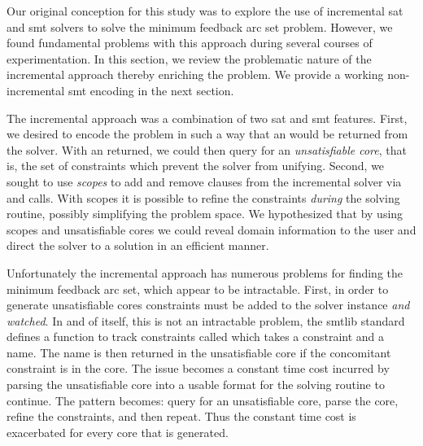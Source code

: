 \label{section:incremental}

Our original conception for this study was to explore the use of incremental
\ac{sat} and \ac{smt} solvers to solve the minimum feedback arc set problem.
However, we found fundamental problems with this approach during several courses
of experimentation. In this section, we review the problematic nature of the
incremental approach thereby enriching the problem. We provide a working
non-incremental \ac{smt} encoding in the next section.

The incremental approach was a combination of two \ac{sat} and \ac{smt}
features. First, we desired to encode the problem in such a way that an
 would be returned from the solver. With an  returned, we
could then query for an \emph{unsatisfiable core}, that is, the set of
constraints which prevent the solver from unifying. Second, we sought to use
\emph{scopes} to add and remove clauses from the incremental solver via
 and  calls. With scopes it is possible to refine the
constraints \emph{during} the solving routine, possibly simplifying the problem
space. We hypothesized that by using scopes and unsatisfiable cores we could
reveal domain information to the user and direct the solver to a solution in an
efficient manner.

Unfortunately the incremental approach has numerous problems for finding the
minimum feedback arc set, which appear to be intractable. First, in order to
generate unsatisfiable cores constraints must be added to the solver instance
\emph{and watched}. In and of itself, this is not an intractable problem, the
\acl{smtlib} standard defines a function to track constraints called
 which takes a constraint and a name. The name is then
returned in the unsatisfiable core if the concomitant constraint is in the core.
The issue becomes a constant time cost incurred by parsing the unsatisfiable
core into a usable format for the solving routine to continue. The pattern
becomes: query for an unsatisfiable core, parse the core, refine the
constraints, and then repeat. Thus the constant time cost is exacerbated for
every core that is generated.

